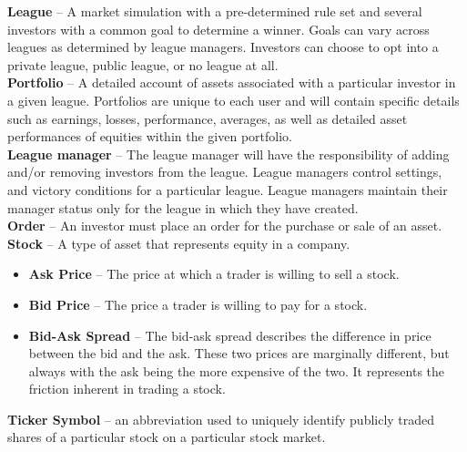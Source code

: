 {\textbf{League} -- A market simulation with a pre-determined rule set
and several investors with a common goal to determine a winner. Goals
can vary across leagues as determined by league managers. Investors can
choose to opt into a private league, public league, or no league at all.\\

\textbf{Portfolio} -- A detailed account of assets associated with a
particular investor in a given league. Portfolios are unique to each user
and will contain specific details such as earnings, losses, performance,
averages, as well as detailed asset performances of equities within the
given portfolio.\\

\textbf{League manager} -- The league manager will have the responsibility
of adding and/or removing investors from the league. League managers
control settings, and victory conditions for a particular league. League
managers maintain their manager status only for the league in which they
have created.\\

\textbf{Order} -- An investor must place an order for the purchase or
sale of an asset.\\

\textbf{Stock} -- A type of asset that represents equity in a company.
\begin{itemize}
    \item \textbf{Ask Price} -- The price at which a trader is willing
                                to sell a stock.\\
    \item \textbf{Bid Price} -- The price a trader is willing to pay for
                                a stock.\\
    \item \textbf{Bid-Ask Spread} -- The bid-ask spread describes the
                                     difference in price between the bid
                                     and the ask. These two prices are
                                     marginally different, but always with
                                     the ask being the more expensive of the
                                     two. It represents the friction inherent
                                     in trading a stock.\cite{inv:bidask}\\
\end{itemize}

\textbf{Ticker Symbol} -- an abbreviation used to uniquely identify publicly
traded shares of a particular stock on a particular stock market.\\

}
